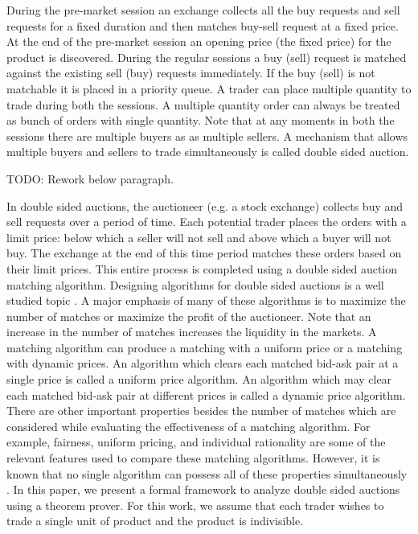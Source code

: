 \documentclass[a4paper,UKenglish,cleveref, autoref]{lipics-v2019}
\begin{document}
During the pre-market session an exchange collects all the buy requests and sell requests for a fixed duration and then matches buy-sell request at a fixed price. At the end of the pre-market session an opening price (the fixed price) for the product is discovered. During the regular sessions a buy (sell) request is matched against the existing sell (buy) requests immediately. If the buy (sell) is not matchable it is placed in a priority queue. A trader can place multiple quantity to trade during both the sessions. A multiple quantity order can always be treated as bunch of orders with single quantity. Note that at any moments in both the sessions there are multiple buyers as as multiple sellers. A mechanism that allows multiple buyers and sellers to trade simultaneously \cite{friedman} is called double sided auction.

TODO: Rework below paragraph.

In double sided auctions, the auctioneer (e.g. a stock exchange) collects buy and sell requests over a period of time. Each potential trader places the orders with a limit price: below which a seller will not sell and above which a buyer will not buy. The exchange at the end of this time period matches these orders based on their limit prices. This entire process is completed using a double sided auction matching algorithm. Designing algorithms for double sided auctions is a well studied topic \cite{mcafee1992, WurmanWW98,NiuP13}. A major emphasis of many of these algorithms is to maximize the number of matches or maximize the profit of the auctioneer. Note that an increase in the number of matches increases the liquidity in the markets. A matching algorithm can produce a matching with a uniform price or a matching with dynamic prices. An algorithm which clears each matched bid-ask pair at a single price is called a uniform price algorithm. An algorithm which may clear each matched bid-ask pair at different prices is called a dynamic price algorithm. There are other important properties besides the number of matches which are considered while evaluating the effectiveness of a matching algorithm. For example, fairness, uniform pricing, and individual rationality are some of the relevant features used to compare these matching algorithms. However, it is known that no single algorithm can possess all of these properties simultaneously \cite{WurmanWW98,mcafee1992}. In this paper, we present a formal framework to analyze double sided auctions using a theorem prover. For this work, we assume that each trader wishes to trade a single unit of product and the product is indivisible.
\end{document}

